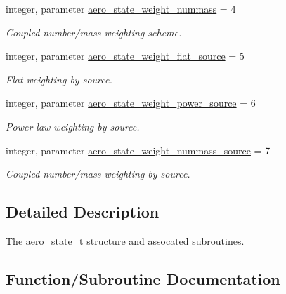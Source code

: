 \begin{DoxyCompactItemize}
integer, parameter \mbox{\hyperlink{namespacepmc__aero__state_aa014d0549b2455e245bef4959b781af3}{aero\+\_\+state\+\_\+weight\+\_\+nummass}} = 4
\begin{DoxyCompactList}\small\item\em Coupled number/mass weighting scheme. \end{DoxyCompactList}\item 
integer, parameter \mbox{\hyperlink{namespacepmc__aero__state_af731fa16fa6f5f7dcb5dde7bc5118b5a}{aero\+\_\+state\+\_\+weight\+\_\+flat\+\_\+source}} = 5
\begin{DoxyCompactList}\small\item\em Flat weighting by source. \end{DoxyCompactList}\item 
integer, parameter \mbox{\hyperlink{namespacepmc__aero__state_a496284ecee4a72a18a45e67f5c17e610}{aero\+\_\+state\+\_\+weight\+\_\+power\+\_\+source}} = 6
\begin{DoxyCompactList}\small\item\em Power-\/law weighting by source. \end{DoxyCompactList}\item 
integer, parameter \mbox{\hyperlink{namespacepmc__aero__state_a22b883c1a2ba3797a44ab2a4104c9d2a}{aero\+\_\+state\+\_\+weight\+\_\+nummass\+\_\+source}} = 7
\begin{DoxyCompactList}\small\item\em Coupled number/mass weighting by source. \end{DoxyCompactList}\end{DoxyCompactItemize}


\subsection{Detailed Description}
The \mbox{\hyperlink{structpmc__aero__state_1_1aero__state__t}{aero\+\_\+state\+\_\+t}} structure and assocated subroutines. 

\subsection{Function/\+Subroutine Documentation}
\mbox{\label{namespacepmc__aero__state_ad9c12bba90caa58b86882ebfe4a4335c}} 
